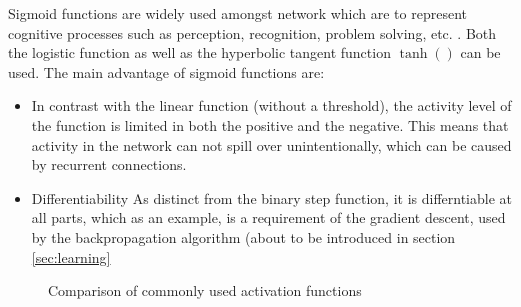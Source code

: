 \documentclass[10pt,a4paper,DIV=11]{scrreprt}
\begin{document}
Sigmoid functions are widely used amongst network which are to represent cognitive processes such as perception, recognition, problem solving, etc. .
Both the logistic function as well as the hyperbolic tangent function $\tanh()$ can be used. The main advantage of sigmoid functions are:

\begin{itemize}
\item In contrast with the linear function (without a threshold), the activity level of the function is limited in both the positive and the negative. This means that activity in the network can not spill over unintentionally, which can be caused by recurrent connections.
\item Differentiability
As distinct from the binary step function, it is differntiable at all parts, which as an example, is a requirement of the gradient descent, used by the backpropagation algorithm (about to be introduced in section \ref{sec:learning}
\end{itemize}


\begin{figure}[H]
\centering
{}



	
\caption{Comparison of commonly used activation functions}
\label{fig:plots}
\end{figure}
\end{document}
